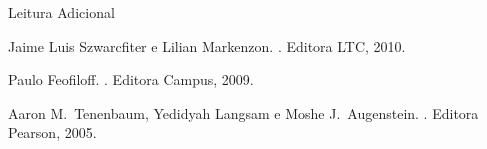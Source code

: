



\begin{frame}{Leitura Adicional}

  \begin{thebibliography}{8}
    Jaime Luis Szwarcfiter e Lilian Markenzon.
    .
    \newblock Editora LTC, 2010.

    Paulo Feofiloff.
    .
    \newblock Editora Campus, 2009.

    Aaron M.\ Tenenbaum, Yedidyah Langsam e Moshe J.\ Augenstein.
    .
    \newblock Editora Pearson, 2005.

  \end{thebibliography}

\end{frame}
